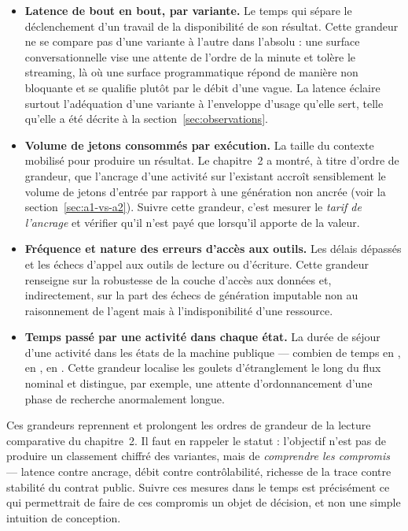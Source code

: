 \begin{itemize}
  \item \textbf{Latence de bout en bout, par variante.} Le temps qui
    sépare le déclenchement d'un travail de la disponibilité de son
    résultat. Cette grandeur ne se compare pas d'une variante à
    l'autre dans l'absolu : une surface conversationnelle vise une
    attente de l'ordre de la minute et tolère le streaming, là où une
    surface programmatique répond de manière non bloquante et se
    qualifie plutôt par le débit d'une vague. La latence éclaire
    surtout l'adéquation d'une variante à l'enveloppe d'usage qu'elle
    sert, telle qu'elle a été décrite à la section~\ref{sec:observations}.
  \item \textbf{Volume de jetons consommés par exécution.} La taille
    du contexte mobilisé pour produire un résultat. Le chapitre~2 a
    montré, à titre d'ordre de grandeur, que l'ancrage d'une activité
    sur l'existant accroît sensiblement le volume de jetons d'entrée
    par rapport à une génération non ancrée (voir la
    section~\ref{sec:a1-vs-a2}). Suivre cette grandeur, c'est mesurer
    le \emph{tarif de l'ancrage} et vérifier qu'il n'est payé que
    lorsqu'il apporte de la valeur.
  \item \textbf{Fréquence et nature des erreurs d'accès aux outils.}
    Les délais dépassés et les échecs d'appel aux outils de lecture ou
    d'écriture. Cette grandeur renseigne sur la robustesse de la
    couche d'accès aux données et, indirectement, sur la part des
    échecs de génération imputable non au raisonnement de l'agent mais
    à l'indisponibilité d'une ressource.
  \item \textbf{Temps passé par une activité dans chaque état.} La
    durée de séjour d'une activité dans les états de la machine
    publique — combien de temps en , en
    , en . Cette grandeur
    localise les goulets d'étranglement le long du flux nominal et
    distingue, par exemple, une attente d'ordonnancement d'une phase
    de recherche anormalement longue.
\end{itemize}

Ces grandeurs reprennent et prolongent les ordres de grandeur de la
lecture comparative du chapitre~2. Il faut en rappeler le statut :
l'objectif n'est pas de produire un classement chiffré des variantes,
mais de \emph{comprendre les compromis} — latence contre ancrage,
débit contre contrôlabilité, richesse de la trace contre stabilité du
contrat public. Suivre ces mesures dans le temps est précisément ce
qui permettrait de faire de ces compromis un objet de décision, et non
une simple intuition de conception.

